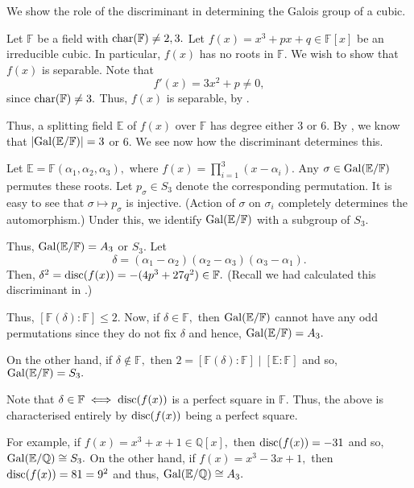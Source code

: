 \begin{ex} \label{ex:galsepcubic}
    We show the role of the discriminant in determining the Galois group of a cubic.

    Let $\mathbb{F}$ be a field with $\operatorname{char}(\mathbb{F}) \neq 2, 3.$ Let $f(x) = x^3 + px + q \in \mathbb{F}[x]$ be an irreducible cubic. In particular, $f(x)$ has no roots in $\mathbb{F}.$ We wish to show that $f(x)$ is separable. Note that
    \begin{equation*} 
        f'(x) = 3x^2 + p \neq 0,
    \end{equation*}
    since $\operatorname{char}(\mathbb{F}) \neq 3.$ Thus, $f(x)$ is separable, by .

    Thus, a splitting field $\mathbb{E}$ of $f(x)$ over $\mathbb{F}$ has degree either $3$ or $6.$ By , we know that ${\left\lvert \operatorname{Gal}(\mathbb{E}/\mathbb{F}) \right\lvert} = 3$ or $6.$ We see now how the discriminant determines this. 

    Let $\mathbb{E} = \mathbb{F}(\alpha_1, \alpha_2, \alpha_3),$ where $f(x) = \prod_{i = 1}^3 (x - \alpha_i).$ Any $\sigma \in \operatorname{Gal}(\mathbb{E}/\mathbb{F})$ permutes these roots. Let $p_\sigma \in S_3$ denote the corresponding permutation. It is easy to see that $\sigma \mapsto p_\sigma$ is injective. (Action of $\sigma$ on $\sigma_i$ completely determines the automorphism.) Under this, we identify $\operatorname{Gal}(\mathbb{E}/\mathbb{F})$ with a subgroup of $S_3.$

    Thus, $\operatorname{Gal}(\mathbb{E}/\mathbb{F}) = A_3$ or $S_3.$ Let
    \begin{equation*} 
        \delta = (\alpha_1 - \alpha_2)(\alpha_2 - \alpha_3)(\alpha_3 - \alpha_1).
    \end{equation*}
    Then, $\delta^2 = \operatorname{disc}(f(x)) = -(4p^3 + 27q^2) \in \mathbb{F}.$ (Recall we had calculated this discriminant in .)

    Thus, $[\mathbb{F}(\delta) : \mathbb{F}] \le 2.$ Now, if $\delta \in \mathbb{F},$ then $\operatorname{Gal}(\mathbb{E}/\mathbb{F})$ cannot have any odd permutations since they do not fix $\delta$ and hence, $\operatorname{Gal}(\mathbb{E}/\mathbb{F}) = A_3.$

    On the other hand, if $\delta \notin \mathbb{F},$ then $2 = [\mathbb{F}(\delta) : \mathbb{F}] \mid [\mathbb{E} : \mathbb{F}]$ and so, $\operatorname{Gal}(\mathbb{E}/\mathbb{F}) = S_3.$

    Note that $\delta \in \mathbb{F} \iff \operatorname{disc}(f(x))$ is a perfect square in $\mathbb{F}.$ Thus, the above is characterised entirely by $\operatorname{disc}(f(x))$ being a perfect square.

    For example, if $f(x) = x^3 + x + 1 \in \mathbb{Q}[x],$ then $\operatorname{disc}(f(x)) = -31$ and so, $\operatorname{Gal}(\mathbb{E}/\mathbb{Q}) \cong S_3.$ On the other hand, if $f(x) = x^3 - 3x + 1,$ then $\operatorname{disc}(f(x)) = 81 = 9^2$ and thus, $\operatorname{Gal}(\mathbb{E}/\mathbb{Q}) \cong A_3.$
\end{ex}


